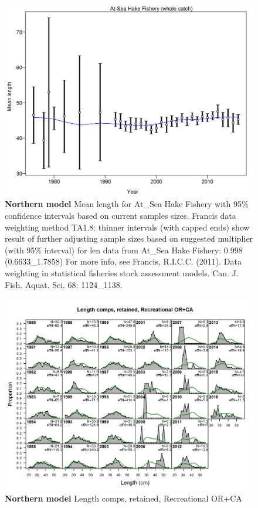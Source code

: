\documentclass[12pt,]{article}
\begin{document}
\begin{figure}[htbp]
\centering
\includegraphics{./tex2pdf.8516/3443a9b550456baecca3caad782a18b3ee419f84.png}
\caption{\textbf{Northern model} Mean length for At\_Sea Hake Fishery
with 95\% confidence intervals based on current samples sizes. Francis
data weighting method TA1.8: thinner intervals (with capped ends) show
result of further adjusting sample sizes based on suggested multiplier
(with 95\% interval) for len data from At\_Sea Hake Fishery: 0.998
(0.6633\_1.7858) For more info, see Francis, R.I.C.C. (2011). Data
weighting in statistical fisheries stock assessment models. Can. J.
Fish. Aquat. Sci. 68: 1124\_1138.
\label{fig:mod1_13_comp_lenfit_data_weighting_TA1.8_At-Sea Hake Fishery}}
\end{figure}

\begin{figure}[htbp]
\centering
\includegraphics{./r4ss/plots_mod1/comp_lenfit_flt3mkt2.png}
\caption{\textbf{Northern model} Length comps, retained, Recreational
OR+CA \label{fig:mod1_14_comp_lenfit_flt3mkt2}}
\end{figure}
\end{document}
